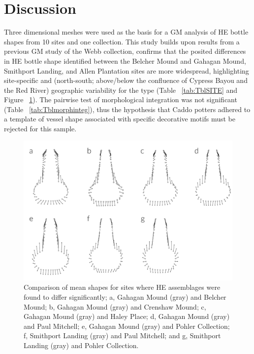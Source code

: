 \documentclass[review]{elsarticle}
\begin{document}
\section{Discussion}

Three dimensional meshes were used as the basis for a GM analysis of HE bottle shapes from 10 sites and one collection. This study builds upon results from a previous GM study of the Webb collection, confirms that the posited differences in HE bottle shape identified between the Belcher Mound and Gahagan Mound, Smithport Landing, and Allen Plantation sites are more widespread, highlighting site-specific and (north-south; above/below the confluence of Cypress Bayou and the Red River) geographic variability for the type (Table ~\ref{tab:TblSITE} and Figure ~\ref{fig:compare}). The pairwise test of morphological integration was not significant (Table ~\ref{tab:Tblmorphinteg}), thus the hypothesis that Caddo potters adhered to a template of vessel shape associated with specific decorative motifs must be rejected for this sample. 

\begin{figure}[ht]\centering
\includegraphics[width=\linewidth]{comparemean}
\caption{Comparison of mean shapes for sites where HE assemblages were found to differ significantly; a, Gahagan Mound (gray) and Belcher Mound; b, Gahagan Mound (gray) and Crenshaw Mound; c, Gahagan Mound (gray) and Haley Place; d, Gahagan Mound (gray) and Paul Mitchell; e, Gahagan Mound (gray) and Pohler Collection; f, Smithport Landing (gray) and Paul Mitchell; and g, Smithport Landing (gray) and Pohler Collection.}
\label{fig:compare}
\end{figure}
\end{document}
